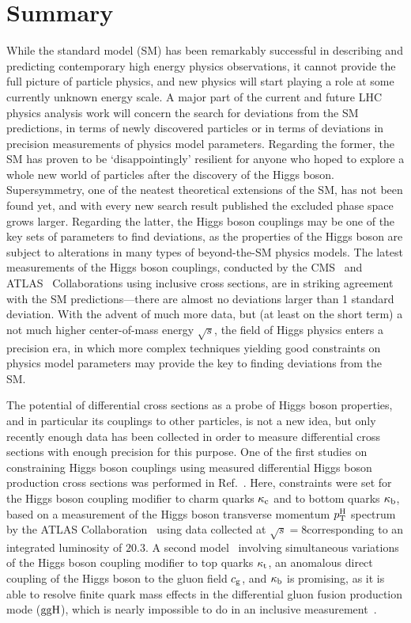 \section{Summary}

While the standard model (SM) has been remarkably successful in describing and predicting contemporary high energy physics observations, it cannot provide the full picture of particle physics, and new physics will start playing a role at some currently unknown energy scale.
% 
A major part of the current and future LHC physics analysis work will concern the search for deviations from the SM predictions, in terms of newly discovered particles or in terms of deviations in precision measurements of physics model parameters.
% 
Regarding the former, the SM has proven to be `disappointingly' resilient for anyone who hoped to explore a whole new world of particles after the discovery of the Higgs boson.
% 
Supersymmetry, one of the neatest theoretical extensions of the SM, has not been found yet, and with every new search result published the excluded phase space grows larger.
% 
Regarding the latter, the Higgs boson couplings may be one of the key sets of parameters to find deviations, as the properties of the Higgs boson are subject to alterations in many types of beyond-the-SM physics models.
% 
The latest measurements of the Higgs boson couplings, conducted by the CMS~\cite{Sirunyan:2018koj} and ATLAS~\cite{ATLAS-CONF-2019-005} Collaborations using inclusive cross sections, are in striking agreement with the SM predictions---there are almost no deviations larger than 1 standard deviation.
% 
With the advent of much more data, but (at least on the short term) a not much higher center-of-mass energy $\sqrt{s}$, the field of Higgs physics enters a precision era, in which more complex techniques yielding good constraints on physics model parameters may provide the key to finding deviations from the SM.


The potential of differential cross sections as a probe of Higgs boson properties, and in particular its couplings to other particles, is not a new idea, but only recently enough data has been collected in order to measure differential cross sections with enough precision for this purpose.
% 
One of the first studies on constraining Higgs boson couplings using measured differential Higgs boson production cross sections was performed in Ref.~\cite{Bishara:2016jga}.
% 
Here, constraints were set for the Higgs boson coupling modifier to charm quarks $\kappa_{\mathrm{c}}$ and to bottom quarks $\kappa_{\mathrm{b}}$, based on a measurement of the Higgs boson transverse momentum $p_\mathrm{T}^\mathrm{H}$ spectrum by the ATLAS Collaboration~\cite{Aad:2015lha} using data collected at $\sqrt{s}=8$\TeV corresponding to an integrated luminosity of $20.3$\fbinv.
% 
A second model~\cite{Grazzini:2017szg,Grazzini:2016paz} involving simultaneous variations of the Higgs boson coupling modifier to top quarks $\kappa_{\mathrm{t}}$, an anomalous direct coupling of the Higgs boson to the gluon field $c_\mathrm{g}$, and $\kappa_{\mathrm{b}}$ is promising, as it is able to resolve finite quark mass effects in the differential gluon fusion production mode ($\mathrm{g}\mathrm{g}\mathrm{H}$), which is nearly impossible to do in an inclusive measurement~\cite{Azatov:2013xha}.


